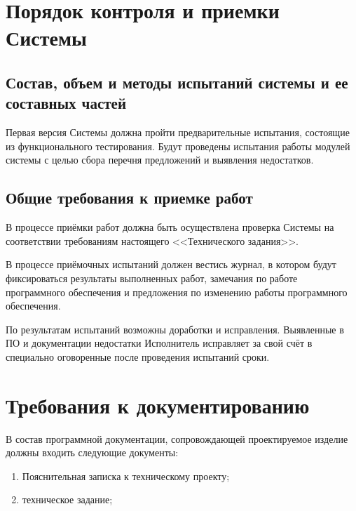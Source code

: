 \vspace{3em}
\chapter{Порядок контроля и приемки Системы}
\label{sec:acceptance}
\section{Состав, объем и методы испытаний системы и ее составных частей}
Первая версия Системы должна пройти предварительные испытания, состоящие из функционального тестирования. 
Будут проведены испытания работы модулей системы с целью сбора перечня предложений и выявления недостатков. 

\section{Общие требования к приемке работ}
В процессе приёмки работ должна быть осуществлена проверка Системы на соответствии требованиям настоящего 
<<Технического задания>>.

В процессе приёмочных испытаний должен вестись журнал, в котором будут фиксироваться результаты выполненных 
работ, замечания по работе программного обеспечения и предложения по изменению работы программного 
обеспечения.

По результатам испытаний возможны доработки и исправления. Выявленные в ПО и документации недостатки 
Исполнитель исправляет за свой счёт в специально оговоренные после проведения испытаний сроки.

\vspace{3em}
\chapter{Требования к документированию}
\label{sec:document}
В состав программной документации, сопровождающей проектируемое изделие должны входить следующие документы:
\begin{enumerate}
    \item Пояснительная записка к техническому проекту;
    \item техническое задание;
\end{enumerate}

\endgroup
\stopcontents[sections]